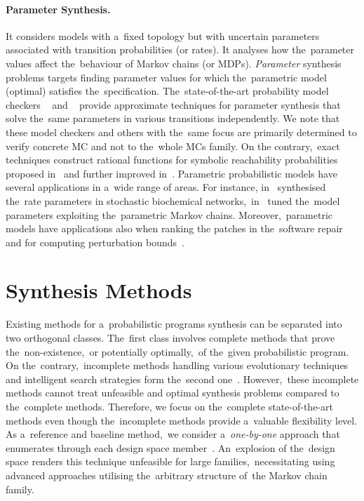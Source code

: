 \paragraph{Parameter Synthesis.}
It considers models with a~fixed topology but with uncertain parameters associated with transition probabilities (or rates).
It analyses how the~parameter values affect the~behaviour of Markov chains (or MDPs).
\textit{Parameter} synthesis problems targets finding parameter values for which the~parametric model (optimal) satisfies the~specification.
The~state-of-the-art probability model checkers \storm{}~\cite{STORM} and \prism{}~\cite{KNP11} provide approximate techniques for parameter synthesis that solve the~same parameters in various transitions independently.
We note that these model checkers and others with the~same focus are primarily determined to verify concrete MC and not to the~whole MCs family.
On the contrary,~exact techniques construct rational functions for symbolic reachability probabilities proposed in~\cite{DBLP:conf/ictac/Daws04} and further improved in~\cite{dehnert2015prophesy}.
Parametric probabilistic models have several applications in a~wide range of areas.
For instance, in~\cite{ceska-biochemical} synthesised the~rate parameters in stochastic biochemical networks,~in~\cite{model-repair-usage} tuned the~model parameters exploiting the~parametric Markov chains.
Moreover,~parametric models have applications also when ranking the patches in the~software repair~\cite{learning-correct-code} and for computing perturbation bounds~\cite{nested-approximation}.

\section{Synthesis Methods}
Existing methods for a~probabilistic programs synthesis can be separated into two orthogonal classes.
The~first class involves complete methods that prove the~non-existence,~or potentially optimally,~of the~given probabilistic program.
On the~contrary,~incomplete methods handling various evolutionary techniques and intelligent search strategies form the~second one~\cite{spl2}.
However,~these incomplete methods cannot treat unfeasible and optimal synthesis problems compared to the~complete methods.
Therefore, we focus on the~complete state-of-the-art methods even though the~incomplete methods provide a~valuable flexibility level.
As a~reference and baseline method,~we consider a~\textit{one-by-one} approach that enumerates through each design space member~\cite{onebyone}.
An~explosion of the~design space renders this technique unfeasible for large families,~necessitating using advanced approaches utilising the~arbitrary structure of~the Markov chain family.

